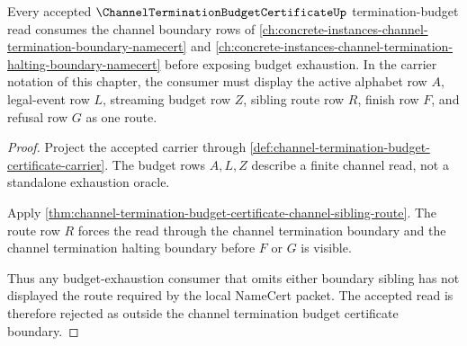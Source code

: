 \begin{theorem}
\label{thm:channel-termination-budget-sibling-route}
Every accepted $\ChannelTerminationBudgetCertificateUp$ termination-budget read consumes the channel boundary rows of \autoref{ch:concrete-instances-channel-termination-boundary-namecert} and \autoref{ch:concrete-instances-channel-termination-halting-boundary-namecert} before exposing budget exhaustion. In the carrier notation of this chapter, the consumer must display the active alphabet row $A$, legal-event row $L$, streaming budget row $Z$, sibling route row $R$, finish row $F$, and refusal row $G$ as one route.
\end{theorem}
\begin{proof}
Project the accepted carrier through \autoref{def:channel-termination-budget-certificate-carrier}. The budget rows $A,L,Z$ describe a finite channel read, not a standalone exhaustion oracle.

Apply \autoref{thm:channel-termination-budget-certificate-channel-sibling-route}. The route row $R$ forces the read through the channel termination boundary and the channel termination halting boundary before $F$ or $G$ is visible.

Thus any budget-exhaustion consumer that omits either boundary sibling has not displayed the route required by the local NameCert packet. The accepted read is therefore rejected as outside the channel termination budget certificate boundary.
\end{proof}
